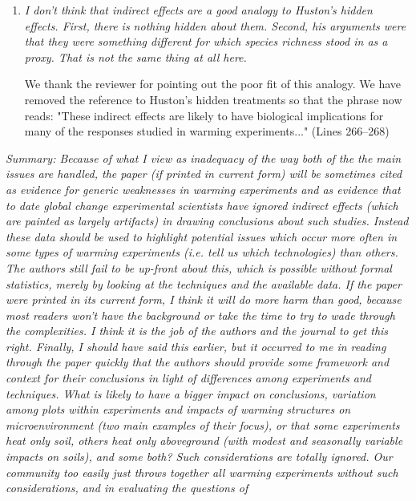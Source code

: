 \documentclass[11pt,a4paper]{letter}
\begin{document}
\begin{letter}{}
\begin{enumerate}
\begin{enumerate}
\item \emph{I don't think that indirect effects are a good analogy to Huston's hidden
effects. First, there is nothing hidden about them. Second, his arguments
were that they were something different for which species richness stood in
as a proxy. That is not the same thing at all here.}\\

\par We thank the reviewer for pointing out the poor fit of this analogy. We have removed the reference to Huston's hidden treatments so that the phrase now reads: "These indirect effects are likely to have biological implications for many of the responses studied in warming experiments..." (Lines 266--268)

\end{enumerate}
\end{enumerate}
\emph{Summary: Because of what I view as inadequacy of the way both of the the
main issues are handled, the paper (if printed in current form) will be
sometimes cited as evidence for generic weaknesses in warming experiments
and as evidence that to date global change experimental scientists have
ignored indirect effects (which are painted as largely artifacts) in drawing
conclusions about such studies.
Instead these data should be used to highlight potential issues which occur
more often in some types of warming experiments (i.e. tell us which
technologies) than others. The authors still fail to be up-front about this, which
is possible without formal statistics, merely by looking at the techniques and
the available data.
If the paper were printed in its current form, I think it will do more harm than
good, because most readers won't have the background or take the time to try
to wade through the complexities. I think it is the job of the authors and the
journal to get this right.
Finally, I should have said this earlier, but it occurred to me in reading through
the paper quickly that the authors should provide some framework and
context for their conclusions in light of differences among experiments and
techniques. What is likely to have a bigger impact on conclusions, variation
among plots within experiments and impacts of warming structures on
microenvironment (two main examples of their focus), or that some
experiments heat only soil, others heat only aboveground (with modest and
seasonally variable impacts on soils), and some both? Such considerations
are totally ignored. Our community too easily just throws together all warming
experiments without such considerations, and in evaluating the questions of
}
\end{letter}
\end{document}

